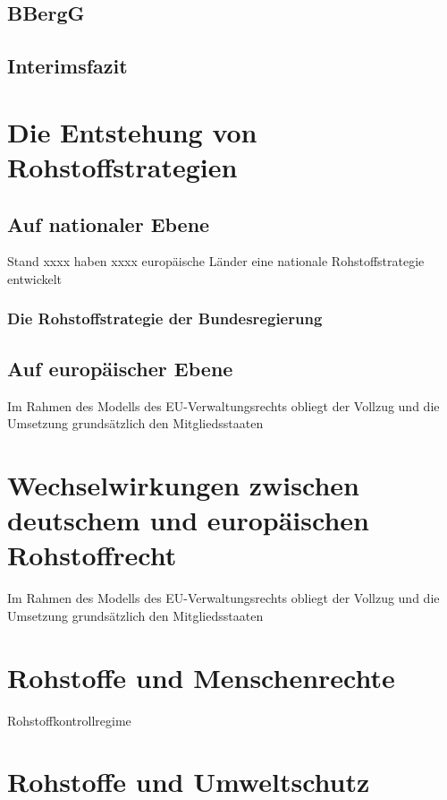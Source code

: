 \documentclass[12pt,a4paper,oneside]{book} %
\begin{document}
	\subsection{BBergG}
	
	\subsection{Interimsfazit}
	
	\section{Die Entstehung von Rohstoffstrategien}
	
	\subsection{Auf nationaler Ebene}
	Stand xxxx haben xxxx europäische Länder eine nationale Rohstoffstrategie entwickelt
	
	\subsubsection{Die Rohstoffstrategie der Bundesregierung}
	
	\subsection{Auf europäischer Ebene}
	
	Im Rahmen des Modells des EU-Verwaltungsrechts obliegt der Vollzug und die Umsetzung grundsätzlich den Mitgliedsstaaten
	
	\section{Wechselwirkungen zwischen deutschem und europäischen Rohstoffrecht}
		Im Rahmen des Modells des EU-Verwaltungsrechts obliegt der Vollzug und die Umsetzung grundsätzlich den Mitgliedsstaaten
	
	\section{Rohstoffe und Menschenrechte}
	
	Rohstoffkontrollregime
	
	\section{Rohstoffe und Umweltschutz}
	
\end{document}
